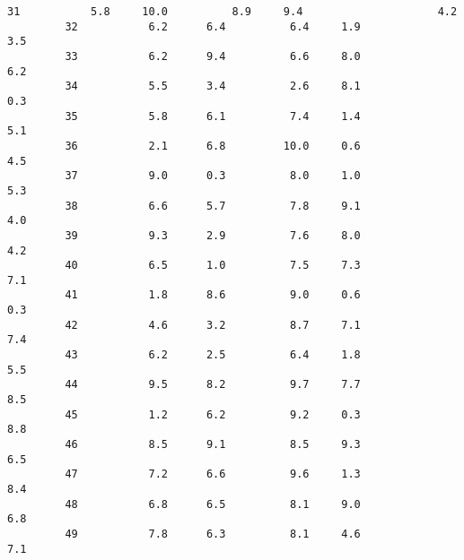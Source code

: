 \documentclass[11pt]{article}
\begin{document}
\begin{Verbatim}[commandchars=\\\{\}]
         31           5.8     10.0          8.9     9.4                     4.2   
         32           6.2      6.4          6.4     1.9                     3.5   
         33           6.2      9.4          6.6     8.0                     6.2   
         34           5.5      3.4          2.6     8.1                     0.3   
         35           5.8      6.1          7.4     1.4                     5.1   
         36           2.1      6.8         10.0     0.6                     4.5   
         37           9.0      0.3          8.0     1.0                     5.3   
         38           6.6      5.7          7.8     9.1                     4.0   
         39           9.3      2.9          7.6     8.0                     4.2   
         40           6.5      1.0          7.5     7.3                     7.1   
         41           1.8      8.6          9.0     0.6                     0.3   
         42           4.6      3.2          8.7     7.1                     7.4   
         43           6.2      2.5          6.4     1.8                     5.5   
         44           9.5      8.2          9.7     7.7                     8.5   
         45           1.2      6.2          9.2     0.3                     8.8   
         46           8.5      9.1          8.5     9.3                     6.5   
         47           7.2      6.6          9.6     1.3                     8.4   
         48           6.8      6.5          8.1     9.0                     6.8   
         49           7.8      6.3          8.1     4.6                     7.1   
         

\end{Verbatim}
\end{document}
